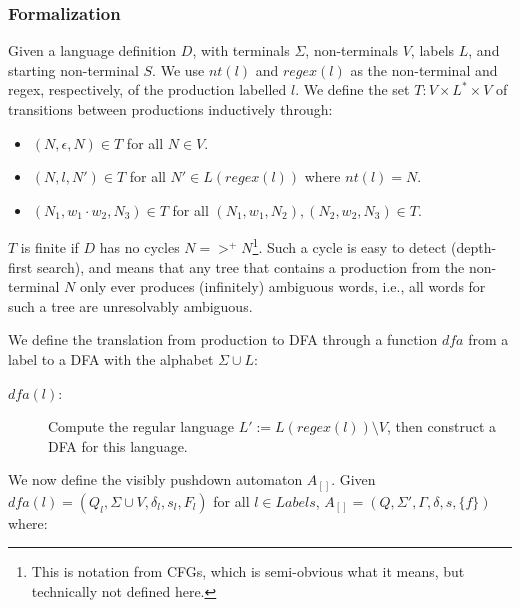 \documentclass[runningheads]{llncs}
\newcommand{\NT}{V} %
\newcommand{\T}{\Sigma} %
\newcommand{\Labels}{L} %
\newcommand{\pospl}{[}
\newcommand{\pospr}{]}
\newcommand{\posp}[1]{\pospl#1\pospr}
\newcommand{\dfa}{\mathit{dfa}} %
\newcommand{\labelnt}{\mathit{nt}} %
\newcommand{\labelregex}{\mathit{regex}} %
\begin{document}
\subsubsection{Formalization}

Given a language definition $D$, with terminals $\T$, non-terminals $\NT$, labels $\Labels$, and starting non-terminal $S$. We use $\labelnt(l)$ and $\labelregex(l)$ as the non-terminal and regex, respectively, of the production labelled $l$. We define the set $T : \NT \times \Labels^{*} \times \NT$ of transitions between productions inductively through:

\begin{itemize}
\item $(N, \epsilon, N) \in T$ for all $N \in \NT$.
\item $(N, l, N') \in T$ for all $N' \in L(\labelregex(l))$ where $\labelnt(l) = N$.
\item $(N_1, w_1 \cdot w_2, N_3) \in T$ for all $(N_1, w_1, N_2), (N_2, w_2, N_3) \in T$.
\end{itemize}

\noindent $T$ is finite if $D$ has no cycles $N =>^{+} N$\footnote{This is notation from CFGs, which is semi-obvious what it means, but technically not defined here.}. Such a cycle is easy to detect (depth-first search), and means that any tree that contains a production from the non-terminal $N$ only ever produces (infinitely) ambiguous words, i.e., all words for such a tree are unresolvably ambiguous.

We define the translation from production to DFA through a function $\dfa$ from a label to a DFA with the alphabet $\T \cup \Labels$:

\begin{description}
\item[$\dfa(l)$:] Compute the regular language $L' := L(\labelregex(l)) \setminus \NT$, then construct a DFA for this language.
\end{description}

\noindent We now define the visibly pushdown automaton $A_{\posp{}}$. Given $\dfa(l) = (Q_l, \T \cup \NT, \delta_l, s_l, F_l)$ for all $l \in Labels$, $A_{\posp{}} = (Q, \T', \Gamma, \delta, s, \{f\})$ where:
\end{document}
